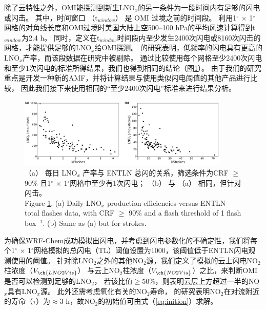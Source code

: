 除了云特性之外，OMI能探测到新生LNO$_x$的另一条件为一段时间内有足够的闪电或闪击。
其中，时间窗口 （t$_{window}$） 是 OMI 过境之前的时间段。
\citet{Lapierre.2020}利用1$^{\circ}$ $\times$ 1$^{\circ}$网格的对角线长度和OMI过境时美国大陆上空500--100 hPa的平均风速计算得到t$_{window}$为2.4 h。
同时，\citet{Lapierre.2020}定义在t$_{window}$时间段内至少发生2400次闪电或8160次闪击的网格，才能提供足够的LNO$_x$给OMI探测。
\citet{Bucsela.2019}的研究表明，低频率的闪电具有更高的LNO$_x$产率，而该段数据在\citet{Lapierre.2020}研究中被剔除。
通过比较使用每个网格至少2400次闪电和至少1次闪电的标准所得结果，我们也得到相同的结论（图\ref{fig:us_flash_threshold}）。
由于我们的研究重点是开发一种新的AMF，并将计算结果与使用类似闪电阈值的其他产品进行比较\citep{Pickering.2016,Lapierre.2020}，
因此我们接下来使用相同的“至少2400次闪电”标准来进行结果分析。


\begin{figure}[H]
\centering
\includegraphics[width=0.9\textwidth]{./figures/us_flash_threshold.png}
\caption{
（a） 每日 LNO$_x$ 产率与 ENTLN 总闪的关系，筛选条件为CRF $\geq$ 90\% 且1$^{\circ}$ $\times$ 1$^{\circ}$网格中至少有1次闪电；
 （b） 与 （a） 相同，但针对闪击。\\
Figure \ref{fig:us_flash_threshold}. (a) Daily LNO$_x$ production efficiencies versus ENTLN total flashes data, with CRF $\geq$ 90\% and a flash threshold of 1 flash box$^{-1}$.
(b) Same as (a) but for strokes.}
\label{fig:us_flash_threshold}
\end{figure}


为确保WRF-Chem成功模拟出闪电，并考虑到闪电参数化的不确定性，我们将每个1$^{\circ}$ $\times$ 1$^{\circ}$网格模拟的总闪电（TL）阈值设置为1000，该阈值低于ENTLN闪电观测使用的阈值。
针对除LNO$_2$之外的其他NO$_2$源，我们定义了模拟的云上闪电NO$_2$柱浓度（$V_{\ch{LNO2Vis}}$）
与云上NO$_2$柱浓度（$V_{\ch{NO2Vis}}$）之比，来判断OMI是否可以检测到足够的LNO$_2$，
若该比值$\geq$50\%，则表明云层上方超过一半的NO$_x$具有LNO$_x$源。
此外还需考虑氧化有关的NO$_2$寿命，
\citet{Nault.2017}的研究表明NO$_2$在对流附近的寿命（$\tau$）为$\approx$3 h，故NO$_2$的初始值可由式（\ref{eq:inition}）求解。


